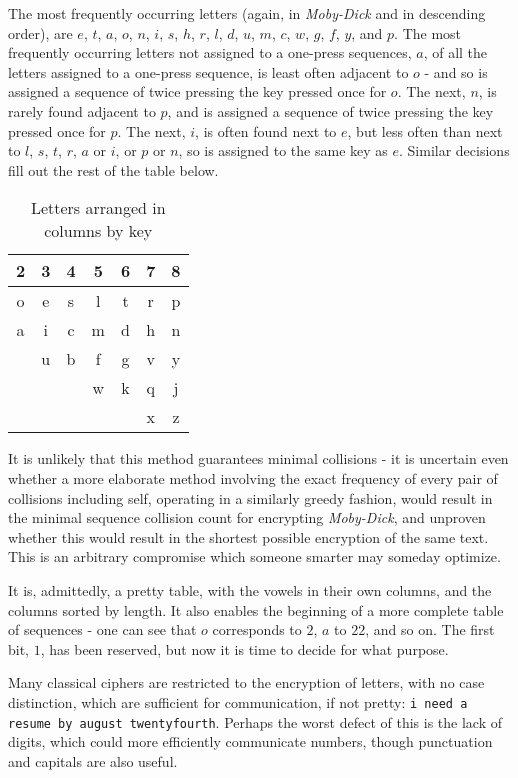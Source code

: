 \documentclass{article}
\begin{document}
The most frequently occurring letters (again, in \textit{Moby-Dick} and in descending order), are $e$, $t$, $a$, $o$, $n$, $i$, $s$, $h$, $r$, $l$, $d$, $u$, $m$, $c$, $w$, $g$, $f$, $y$, and $p$.  The most frequently occurring letters not assigned to a one-press sequences, $a$, of all the letters assigned to a one-press sequence, is least often adjacent to $o$ - and so is assigned a sequence of twice pressing the key pressed once for $o$.  The next, $n$, is rarely found adjacent to $p$, and is assigned a sequence of twice pressing the key pressed once for $p$.  The next, $i$, is often found next to $e$, but less often than next to $l$, $s$, $t$, $r$, $a$ or $i$, or $p$ or $n$, so is assigned to the same key as $e$.  Similar decisions fill out the rest of the table below.

\begin{table}
    \centering
    \begin{tabular}{ccccccc}
        2 & 3 & 4 & 5 & 6 & 7 & 8\\
        \hline
        o & e & s & l & t & r & p\\
        a & i & c & m & d & h & n\\
         & u & b & f & g & v & y\\
         &  &  & w & k & q & j\\
         &  &  &  &  & x & z\\
    \end{tabular}
    \caption{Letters arranged in columns by key}
    \label{tab:my_label}
\end{table}

It is unlikely that this method guarantees minimal collisions - it is uncertain even whether a more elaborate method involving the exact frequency of every pair of collisions including self, operating in a similarly greedy fashion, would result in the minimal sequence collision count for encrypting \textit{Moby-Dick}, and unproven whether this would result in the shortest possible encryption of the same text.  This is an arbitrary compromise which someone smarter may someday optimize.

It is, admittedly, a pretty table, with the vowels in their own columns, and the columns sorted by length.  It also enables the beginning of a more complete table of sequences - one can see that $o$ corresponds to $2$, $a$ to $22$, and so on.  The first bit, $1$, has been reserved, but now it is time to decide for what purpose.

Many classical ciphers are restricted to the encryption of letters, with no case distinction, which are sufficient for communication, if not pretty:
\verb|i need a resume by august twentyfourth|.  Perhaps the worst defect of this is the lack of digits, which could more efficiently communicate numbers, though punctuation and capitals are also useful.
\end{document}
